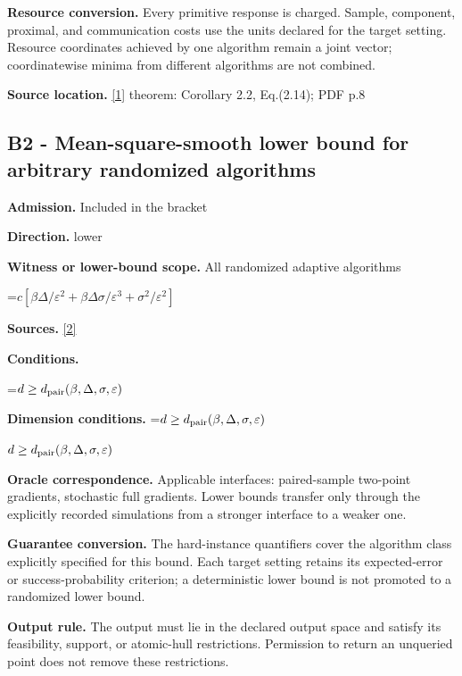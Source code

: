 \documentclass[10pt,a4paper]{article}
\newcommand{\AtlasMath}[1]{\par\begingroup\centering\setbox0=\hbox{$\displaystyle #1$}\ifdim\wd0>1.4\linewidth\typeout{ATLAS WIDE FORMULA: \the\wd0}\fi\ifdim\wd0>\linewidth\resizebox{\linewidth}{!}{\box0}\else\box0\fi\par\endgroup}
\newcommand{\AtlasInlineMath}[1]{\begingroup\setbox0=\hbox{$#1$}\ifdim\wd0>.4\linewidth\endgroup\AtlasMath{#1}\else\endgroup$#1$\fi}
\begin{document}
\textbf{Resource conversion.} Every primitive response is charged. Sample, component, proximal, and communication costs use the units declared for the target setting. Resource coordinates achieved by one algorithm remain a joint vector; coordinatewise minima from different algorithms are not combined.



\textbf{Source location.} \href{https://arxiv.org/pdf/1309.5549}{[1]} theorem: Corollary 2.2, Eq.(2.14); PDF p.8



\subsection{B2 - Mean-square-smooth lower bound for arbitrary randomized algorithms}


\textbf{Admission.} Included in the bracket



\textbf{Direction.} lower



\textbf{Witness or lower-bound scope.} All randomized adaptive algorithms



\AtlasMath{c[\beta\Delta/\varepsilon^2+\beta\Delta\sigma/\varepsilon^3+\sigma^2/\varepsilon^2]}


\textbf{Sources.} \href{https://arxiv.org/pdf/1912.02365}{[2]}



\textbf{Conditions.}
\AtlasMath{d\ge d_{\rm pair}(\beta,\Delta,\sigma,\varepsilon)}




\textbf{Dimension conditions.} \AtlasInlineMath{d\ge d_{\rm pair}(\beta,\Delta,\sigma,\varepsilon)}



\textbf{Oracle correspondence.} Applicable interfaces: paired-sample two-point gradients, stochastic full gradients. Lower bounds transfer only through the explicitly recorded simulations from a stronger interface to a weaker one.



\textbf{Guarantee conversion.} The hard-instance quantifiers cover the algorithm class explicitly specified for this bound. Each target setting retains its expected-error or success-probability criterion; a deterministic lower bound is not promoted to a randomized lower bound.



\textbf{Output rule.} The output must lie in the declared output space and satisfy its feasibility, support, or atomic-hull restrictions. Permission to return an unqueried point does not remove these restrictions.
\end{document}
